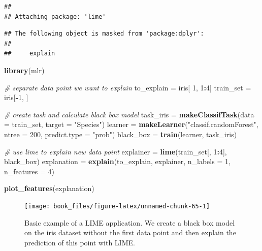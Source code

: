 \documentclass[
]{krantz}
\newenvironment{Shaded}{\begin{snugshade}}{\end{snugshade}}
\newcommand{\CommentTok}[1]{\textcolor[rgb]{0.56,0.35,0.01}{\textit{#1}}}
\newcommand{\DataTypeTok}[1]{\textcolor[rgb]{0.13,0.29,0.53}{#1}}
\newcommand{\DecValTok}[1]{\textcolor[rgb]{0.00,0.00,0.81}{#1}}
\newcommand{\KeywordTok}[1]{\textcolor[rgb]{0.13,0.29,0.53}{\textbf{#1}}}
\newcommand{\NormalTok}[1]{#1}
\newcommand{\OperatorTok}[1]{\textcolor[rgb]{0.81,0.36,0.00}{\textbf{#1}}}
\newcommand{\StringTok}[1]{\textcolor[rgb]{0.31,0.60,0.02}{#1}}
\begin{document}
\begin{verbatim}
## 
## Attaching package: 'lime'
\end{verbatim}

\begin{verbatim}
## The following object is masked from 'package:dplyr':
## 
##     explain
\end{verbatim}

\begin{Shaded}
\begin{Highlighting}[]
\KeywordTok{library}\NormalTok{(mlr)}

\CommentTok{# separate data point we want to explain}
\NormalTok{to_explain  =}\StringTok{ }\NormalTok{iris[ }\DecValTok{1}\NormalTok{, }\DecValTok{1}\OperatorTok{:}\DecValTok{4}\NormalTok{]}
\NormalTok{train_set   =}\StringTok{ }\NormalTok{iris[}\OperatorTok{-}\DecValTok{1}\NormalTok{, ]}

\CommentTok{# create task and calculate black box model}
\NormalTok{task_iris   =}\StringTok{ }\KeywordTok{makeClassifTask}\NormalTok{(}\DataTypeTok{data =}\NormalTok{ train_set, }
                              \DataTypeTok{target =} \StringTok{"Species"}\NormalTok{)}
\NormalTok{learner     =}\StringTok{ }\KeywordTok{makeLearner}\NormalTok{(}\StringTok{"classif.randomForest"}\NormalTok{, }
                          \DataTypeTok{ntree =} \DecValTok{200}\NormalTok{, }\DataTypeTok{predict.type =} \StringTok{"prob"}\NormalTok{)}
\NormalTok{black_box   =}\StringTok{ }\KeywordTok{train}\NormalTok{(learner, task_iris)}

\CommentTok{# use lime to explain new data point}
\NormalTok{explainer   =}\StringTok{ }\KeywordTok{lime}\NormalTok{(train_set[, }\DecValTok{1}\OperatorTok{:}\DecValTok{4}\NormalTok{], black_box)}
\NormalTok{explanation =}\StringTok{ }\KeywordTok{explain}\NormalTok{(to_explain,}
\NormalTok{                      explainer,}
                      \DataTypeTok{n_labels =} \DecValTok{1}\NormalTok{,}
                      \DataTypeTok{n_features =} \DecValTok{4}\NormalTok{)}

\KeywordTok{plot_features}\NormalTok{(explanation)}
\end{Highlighting}
\end{Shaded}

\begin{figure}

{\centering \texttt{[image: book\_files/figure-latex/unnamed-chunk-65-1]} 

}

\caption{Basic example of a LIME application. We create a black box model on the iris dataset without the first data point and then explain the prediction of this point with LIME.}\label{fig:unnamed-chunk-65}
\end{figure}
\end{document}
